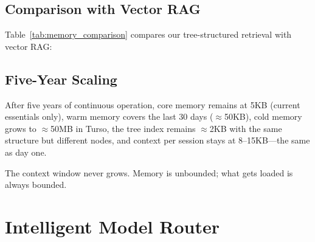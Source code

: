 \documentclass[conference]{IEEEtran}
\begin{document}
\subsection{Comparison with Vector RAG}

Table~\ref{tab:memory_comparison} compares our tree-structured retrieval with vector RAG:

\begin{table}[h]
\centering
\caption{Tree search vs. vector RAG comparison}
\label{tab:memory_comparison}
\end{table}

\subsection{Five-Year Scaling}

After five years of continuous operation, core memory remains at 5KB (current essentials only), warm memory covers the last 30 days ($\approx$50KB), cold memory grows to $\approx$50MB in Turso, the tree index remains $\approx$2KB with the same structure but different nodes, and context per session stays at 8--15KB---the same as day one.

The context window never grows. Memory is unbounded; what gets loaded is always bounded.



\section{Intelligent Model Router}
\label{sec:router}
\end{document}
